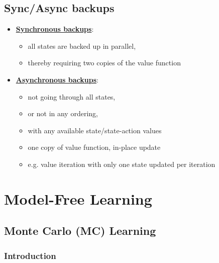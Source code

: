 \documentclass[twocolumn,landscape,10pt]{article}
\theoremstyle{definition}
\begin{document}
\subsection{Sync/Async backups}

\begin{itemize}
    \item \textbf{\underline{Synchronous backups}}: 
        \begin{itemize}
            \item all states are backed up in parallel,
            \item thereby requiring two copies of the value function
        \end{itemize}
    \item \textbf{\underline{Asynchronous backups}}:
        \begin{itemize}
            \item not going through all states,
            \item or not in any ordering,
            \item with any available state/state-action values
            \item one copy of value function, in-place update
            \item e.g. value iteration with only one state updated per iteration
        \end{itemize}
\end{itemize}

\section{Model-Free Learning}

\subsection{Monte Carlo (MC) Learning}

\subsubsection{Introduction}
\end{document}
